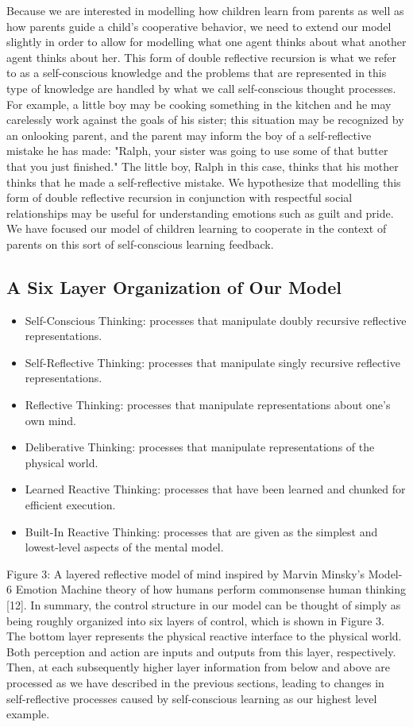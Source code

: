 Because we are interested in modelling how children learn from parents
as well as how parents guide a child's cooperative behavior, we need
to extend our model slightly in order to allow for modelling what one
agent thinks about what another agent thinks about her. This form of
double reflective recursion is what we refer to as a self-conscious
knowledge and the problems that are represented in this type of
knowledge are handled by what we call self-conscious thought
processes. For example, a little boy may be cooking something in the
kitchen and he may carelessly work against the goals of his sister;
this situation may be recognized by an onlooking parent, and the
parent may inform the boy of a self-reflective mistake he has made:
"Ralph, your sister was going to use some of that butter that you just
finished." The little boy, Ralph in this case, thinks that his mother
thinks that he made a self-reflective mistake. We hypothesize that
modelling this form of double reflective recursion in conjunction with
respectful social relationships may be useful for understanding
emotions such as guilt and pride. We have focused our model of
children learning to cooperate in the context of parents on this sort
of self-conscious learning feedback.

\subsection{A Six Layer Organization of Our Model}

\begin{itemize}
\item{Self-Conscious Thinking: processes that manipulate doubly recursive reflective representations.}
\item{Self-Reflective Thinking: processes that manipulate singly recursive reflective representations.}
\item{Reflective Thinking: processes that manipulate representations about one's own mind.}
\item{Deliberative Thinking: processes that manipulate representations of the physical world.}
\item{Learned Reactive Thinking: processes that have been learned and chunked for efficient execution.}
\item{Built-In Reactive Thinking: processes that are given as the simplest and lowest-level aspects of the mental model.}
\end{itemize}

Figure 3: A layered reflective model of mind inspired by Marvin
Minsky's Model-6 Emotion Machine theory of how humans perform
commonsense human thinking [12].  In summary, the control structure in
our model can be thought of simply as being roughly organized into six
layers of control, which is shown in Figure 3. The bottom layer
represents the physical reactive interface to the physical world. Both
perception and action are inputs and outputs from this layer,
respectively. Then, at each subsequently higher layer information from
below and above are processed as we have described in the previous
sections, leading to changes in self-reflective processes caused by
self-conscious learning as our highest level example.

